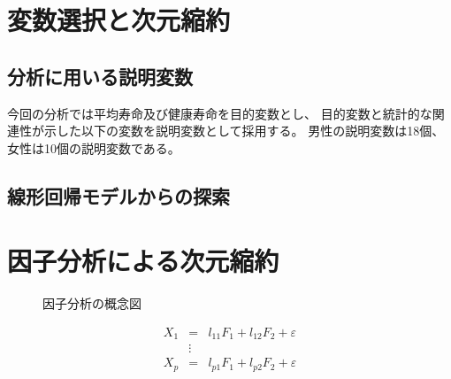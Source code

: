 \documentclass[a4j,11pt,mc, twocolumn]{jreport}
\begin{document}







\chapter{変数選択と次元縮約}





	\section{分析に用いる説明変数}

今回の分析では平均寿命及び健康寿命を目的変数とし、
目的変数と統計的な関連性が示した以下の変数を説明変数として採用する。
男性の説明変数は18個、女性は10個の説明変数である。







	\section{線形回帰モデルからの探索}




\chapter{因子分析による次元縮約}

\begin{figure}
	\caption{因子分析の概念図}
	\label{FAdiagram}
\end{figure}


	\begin{eqnarray}
	X_1 &=&l_{11}F_1+l_{12}F_2+\varepsilon\\
	&\vdots&\\\nonumber
	X_p &=&l_{p1}F_1+l_{p2}F_2+\varepsilon
	\end{eqnarray}
\end{document}
